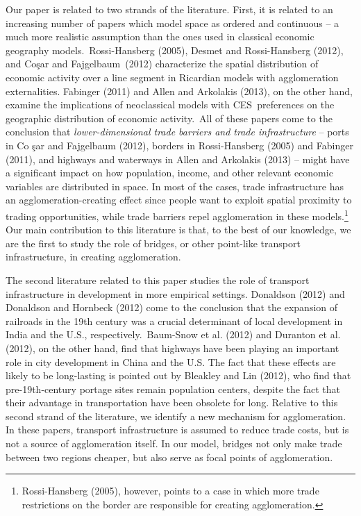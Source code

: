 \documentclass[12pt]{article}
\begin{document}
Our paper is related to two strands of the literature. First, it is related
to an increasing number of papers which model space as ordered and
continuous -- a much more realistic assumption than the ones used in
classical economic geography models.\ Rossi-Hansberg (2005), Desmet and
Rossi-Hansberg (2012), and Co\c{s}ar and Fajgelbaum\ (2012) characterize the
spatial distribution of economic activity over a line segment in Ricardian
models with agglomeration externalities. Fabinger (2011) and Allen and
Arkolakis (2013), on the other hand, examine the implications of
neoclassical models with CES\ preferences on the geographic distribution of
economic activity.\ All of these papers come to the conclusion that \textit{%
lower-dimensional trade barriers and trade infrastructure} -- ports in Co%
\c{s}ar and Fajgelbaum (2012), borders in Rossi-Hansberg (2005) and Fabinger
(2011), and highways and waterways in Allen and Arkolakis (2013) -- might
have a significant impact on how population, income, and other relevant
economic variables are distributed in space. In most of the cases, trade
infrastructure has an agglomeration-creating effect since people want to
exploit spatial proximity to trading opportunities, while trade barriers
repel agglomeration in these models.\footnote{%
Rossi-Hansberg (2005), however, points to a case in which more trade
restrictions on the border are responsible for creating agglomeration.} Our
main contribution to this literature is that, to the best of our knowledge,
we are the first to study the role of bridges, or other point-like transport
infrastructure, in creating agglomeration.

The second literature related to this paper studies the role of transport
infrastructure in development in more empirical settings. Donaldson (2012)
and Donaldson and Hornbeck (2012) come to the conclusion that the expansion
of railroads in the 19th century was a crucial determinant of local
development in India and the U.S., respectively.\ Baum-Snow et al. (2012)
and Duranton et al. (2012), on the other hand, find that highways have been
playing an important role in city development in China and the U.S. The fact
that these effects are likely to be long-lasting is pointed out by Bleakley
and Lin (2012), who find that pre-19th-century portage sites remain
population centers, despite the fact that their advantage in transportation
have been obsolete for long. Relative to this second strand of the
literature, we identify a new mechanism for agglomeration. In these papers,
transport infrastructure is assumed to reduce trade costs, but is not a
source of agglomeration itself. In our model, bridges not only make trade
between two regions cheaper, but also serve as focal points of agglomeration.
\end{document}
